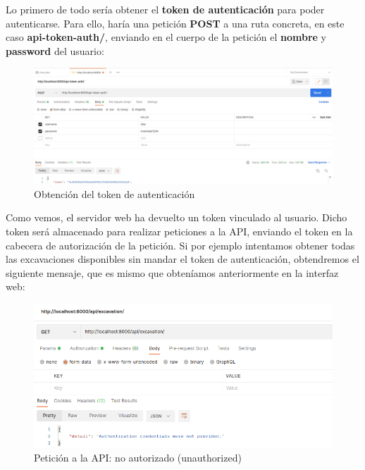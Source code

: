 Lo primero de todo sería obtener el \textbf{token de autenticación} para poder autenticarse.
Para ello, haría una petición \textbf{POST} a una ruta concreta, en este caso
\textbf{api-token-auth/}, enviando en el cuerpo de la petición el \textbf{nombre} y
\textbf{password} del usuario:

        \begin{figure}[H]
            \centering
            \includegraphics[scale=0.25]{imagenes/get-token.png}
            \caption{Obtención del token de autenticación}
            \label{fig:get-token}
        \end{figure}

Como vemos, el servidor web ha devuelto un token vinculado al usuario. Dicho token será
almacenado para realizar peticiones a la API, enviando el token en la cabecera de
autorización de la petición. Si por ejemplo intentamos obtener todas las excavaciones
disponibles sin mandar el token de autenticación, obtendremos el siguiente mensaje, que es
mismo que obteníamos anteriormente en la interfaz web:

    \begin{figure}[H]
        \centering
        \includegraphics[scale=0.45]{imagenes/unauthorized2.png}
        \caption{Petición a la API: no autorizado (unauthorized)}
        \label{fig:unauthorized2}
    \end{figure}

